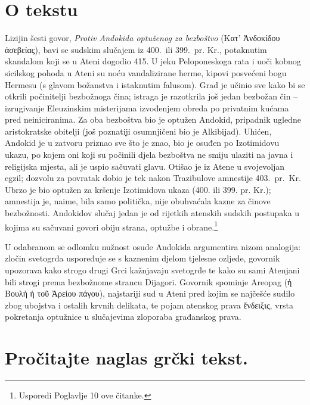 
\section*{O tekstu}

Lizijin šesti govor, \textit{Protiv Andokida optuženog za bezboštvo} \textgreek{(Κατ' Ἀνδοκίδου ἀσεβείας),} bavi se sudskim slučajem iz 400.\ ili 399.\ pr. Kr., potaknutim skandalom koji se u Ateni dogodio 415. U jeku Peloponeskoga rata i uoči kobnog sicilskog pohoda u Ateni su noću vandalizirane herme, kipovi posvećeni bogu Hermesu (s glavom božanstva i istaknutim falusom). Grad je učinio sve kako bi se otkrili počinitelji bezbožnoga čina; istraga je razotkrila još jedan bezbožan čin – izrugivanje Eleuzinskim misterijama izvođenjem obreda po privatnim kućama pred neiniciranima. Za oba bezboštva bio je optužen Andokid, pripadnik ugledne aristokratske obitelji (još poznatiji osumnjičeni bio je Alkibijad). Uhićen, Andokid je u zatvoru priznao sve što je znao, bio je osuđen po Izotimidovu ukazu, po kojem oni koji su počinili djela bezboštva ne smiju ulaziti na javna i religijska mjesta, ali je uspio sačuvati glavu. Otišao je iz Atene u svojevoljan egzil; dozvolu za povratak dobio je tek nakon Trazibulove amnestije 403.\ pr.~Kr. Ubrzo je bio optužen za kršenje Izotimidova ukaza (400. ili 399. pr. Kr.); amnestija je, naime, bila samo politička, nije obuhvaćala kazne za činove bezbožnosti. Andokidov slučaj jedan je od rijetkih atenskih sudskih postupaka u kojima su sačuvani govori obiju strana, optužbe i obrane.\footnote{Usporedi Poglavlje 10 ove čitanke.}

U odabranom se odlomku nužnost osude Andokida argumentira nizom analogija: zločin svetogrđa uspoređuje se s kaznenim djelom tjelesne ozljede, govornik upozorava kako strogo drugi Grci kažnjavaju svetogrđe te kako su sami Atenjani bili strogi prema bezbožnome strancu Dijagori. Govornik spominje Areopag \textgreek{(ἡ Βουλὴ ἡ τοῦ Ἀρείου πάγου),} najstariji sud u Ateni pred kojim se najčešće sudilo zbog ubojstva i ostalih krvnih delikata, te pojam atenskog prava \textgreek{ἔνδειξις,} vrsta pokretanja optužnice u slučajevima zloporaba građanskog prava. 



\section*{Pročitajte naglas grčki tekst.}

